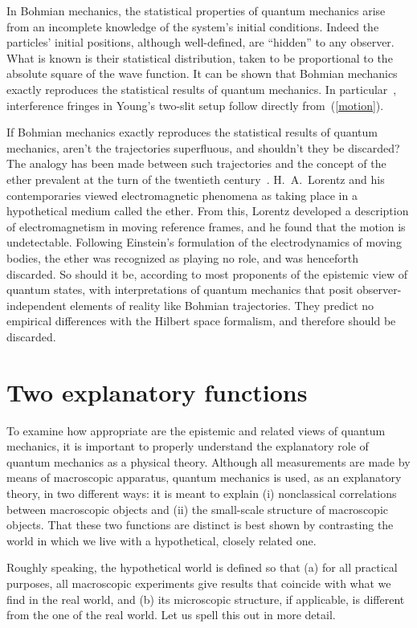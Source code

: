 \documentclass[12pt]{article}
\begin{document}
In Bohmian mechanics, the statistical properties
of quantum mechanics arise from an incomplete
knowledge of the system's initial conditions.  Indeed
the particles' initial positions, although well-defined,
are ``hidden'' to any observer.  What is known is their
statistical distribution, taken to be proportional
to the absolute square of the wave function.  It
can be shown that Bohmian mechanics exactly
reproduces the statistical results of quantum
mechanics.  In particular~\cite{philippidis},
interference fringes in Young's two-slit setup follow
directly from~(\ref{motion}).

If Bohmian mechanics exactly reproduces the statistical
results of quantum mechanics, aren't the trajectories
superfluous, and shouldn't they be discarded?
The analogy has been made between such trajectories
and the concept of the ether prevalent at the turn
of the twentieth century~\cite{bub1,bub2}.
H.~A.~Lorentz and his contemporaries
viewed electromagnetic phenomena as taking place
in a hypothetical medium called the ether.  From
this, Lorentz developed a description of
electromagnetism in moving reference frames,
and he found that the motion is
undetectable.  Following Einstein's formulation of
the electrodynamics of moving
bodies, the ether was recognized as
playing no role, and was henceforth discarded.
So should it be, according to most proponents of the
epistemic view of quantum states, with interpretations
of quantum mechanics that posit observer-independent
elements of reality like Bohmian trajectories.
They predict no empirical differences
with the Hilbert space formalism, and therefore
should be discarded.
%
\section{Two explanatory functions}
%
To examine how appropriate are the epistemic
and related views of quantum mechanics, it is important
to properly understand the explanatory role of
quantum mechanics as a physical theory.
Although all measurements are made
by means of macroscopic apparatus, quantum
mechanics is used, as an explanatory theory,
in two different ways: it is meant to explain
(i) nonclassical correlations between macroscopic
objects and (ii) the small-scale structure of
macroscopic objects.  That these two functions
are distinct is best shown by contrasting the world
in which we live with a hypothetical, closely
related one.

Roughly speaking, the hypothetical world is defined
so that (a) for all practical purposes,
all macroscopic experiments give results
that coincide with what we find in the real world,
and (b) its microscopic structure, if applicable,
is different from the one of the real world.  Let
us spell this out in more detail.
\end{document}
